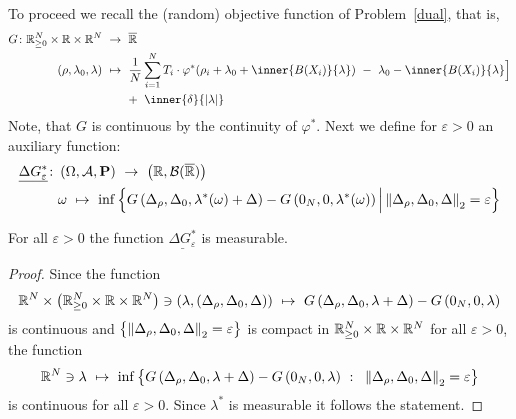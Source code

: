 To proceed we recall the (random) objective function of Problem~\ref{dual}, that is,
\begin{align*}
  G\colon
  \R^N_{\ge 0}
  \times
  \R
  \times
  \R^{N}
  &
  \ 
  \to
  \ 
  \overline{\R}
  \\
  \left( 
    \rho
    ,
    \lambda_0,
    \lambda
  \right)
  &
  \ 
  \mapsto
  \ 
    \frac{1}{N}
\sum_{i=1} 
^N
  T_i
  \cdot
  \varphi^*
  \!
  \left( 
    \rho_i
    +
\lambda_0
+
\inner
{B(X_i)}
{
\lambda
}
  \right)
  \ 
  -
  \ 
\lambda_0
-
\inner
{B(X_i)}
{
\lambda
}
\Big]
  \\
  &
  \qquad 
+
\ 
\inner
{\delta}
{
  |\lambda|
}
\end{align*}
Note, that $G$ is continuous by the continuity of $\varphi^*$.
Next we define for $\varepsilon>0$ an auxiliary function:
   \begin{align*}
     \underline{
     \Delta G^*
     _\varepsilon
     }
     \colon
     &
     \left( \Omega,\mathcal{A},\P \right)
     \ 
     \to
     \ 
     \left( 
       \R,\mathcal{B}(\overline{\R})
     \right)
     \\
     &
     \omega
     \ 
     \mapsto
     \ 
   \inf
   \left\{ 
 G
   \left( 
\Delta_\rho,\Delta_0,\lambda^*(\omega)+\Delta
   \right)
   -
   G
   \left(
0_N,0,\lambda^*(\omega)
   \right)
   \Big\lvert
   \norm{
\Delta_\rho,\Delta_0,\Delta
   }_2
   =\varepsilon
   \right\}
   \end{align*}
\begin{lemma}
  \label{G_meas}
  For all $\varepsilon>0$ the function
  $
     \underline{
     \Delta G^*
     _\varepsilon
     }
  $
  is measurable.
\end{lemma}
\begin{proof}
  Since the function
  \begin{align*}
    \R^{N}
    \times
    \left( 
    \R^N_{\ge 0}\times\R\times\R^N
    \right)
    \ni
    \left( 
    \lambda,(\Delta_\rho,\Delta_0,\Delta)
    \right)
    \ 
    \mapsto
    \ 
 G
   \left( 
     \Delta_\rho,\Delta_0,\lambda+\Delta
   \right)
   -
   G
   \left(
     0_N,0,\lambda
   \right)
  \end{align*}
  is continuous and 
  $
  \left\{
   \left\lVert
\Delta_\rho,\Delta_0,\Delta
   \right\rVert_2
   =\varepsilon
  \right\}
  $
  is compact in 
  $
    \mathbb{R}^N_{\ge 0}\times\mathbb{R}\times\mathbb{R}^N
    $
    for all $\varepsilon>0$,
  the function
\begin{align*}
    \R^{N}
    \ni
    \lambda
    \ 
    \mapsto
    \ 
    \inf
    \left\{ 
  G
   \left( 
     \Delta_\rho,\Delta_0,\lambda+\Delta
   \right)
   -
   G
   \left(
     0_N,0,\lambda
   \right)
   \ 
   \colon
   \ 
   \norm{
\Delta_\rho,\Delta_0,\Delta
   }_2
   =\varepsilon
    \right\}
   \end{align*}
is continuous for all $\varepsilon>0$.
Since 
$
\lambda^*
$
is measurable it follows the statement.
\end{proof}
